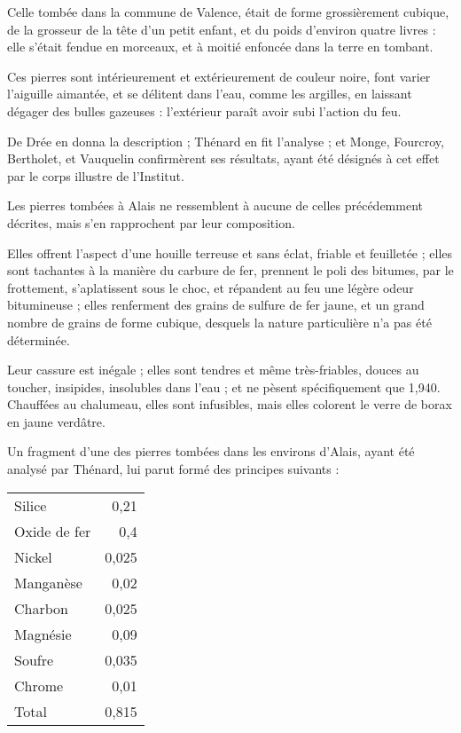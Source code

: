 \documentclass[a4paper, 12pt, oneside, french]{article}
\begin{document}
Celle tombée dans la commune de Valence, était de forme grossièrement cubique, de la grosseur de la tête d'un petit enfant, et du poids d'environ quatre livres : elle s'était fendue en morceaux, et à moitié enfoncée dans la terre en tombant.

Ces pierres sont intérieurement et extérieurement de couleur noire, font varier l'aiguille aimantée, et se délitent dans l'eau, comme les argilles, en laissant dégager des bulles gazeuses : l'extérieur paraît avoir subi l'action du feu.

De Drée en donna la description ; Thénard en fit l'analyse ; et Monge, Fourcroy, Bertholet, et Vauquelin confirmèrent ses résultats, ayant été désignés à cet effet par le corps illustre de l'Institut.

Les pierres tombées à Alais ne ressemblent à aucune de celles précédemment décrites, mais s'en rapprochent par leur composition.

Elles offrent l'aspect d'une houille terreuse et sans éclat, friable et feuilletée ; elles sont tachantes à la manière du carbure de fer, prennent le poli des bitumes, par le frottement, s'aplatissent sous le choc, et répandent au feu une légère odeur bitumineuse ; elles renferment des grains de sulfure de fer jaune, et un grand nombre de grains de forme cubique, desquels la nature particulière n'a pas été déterminée.

Leur cassure est inégale ; elles sont tendres et même très-friables, douces au toucher, insipides, insolubles dans l'eau ; et ne pèsent spécifiquement que 1,940. Chauffées au chalumeau, elles sont infusibles, mais elles colorent le verre de borax en jaune verdâtre.

Un fragment d'une des pierres tombées dans les environs d'Alais, ayant été analysé par Thénard, lui parut formé des principes suivants :
\begin{table}[H]
    \centering
    \begin{tabular}{l r}
        Silice & 0,21 \\
        Oxide de fer & 0,4 \\
        Nickel & 0,025 \\
        Manganèse & 0,02 \\
        Charbon & 0,025 \\
        Magnésie & 0,09 \\
        Soufre & 0,035 \\
        Chrome & 0,01 \\ \hline
        Total & 0,815 \\
    \end{tabular}
\end{table}
\end{document}
